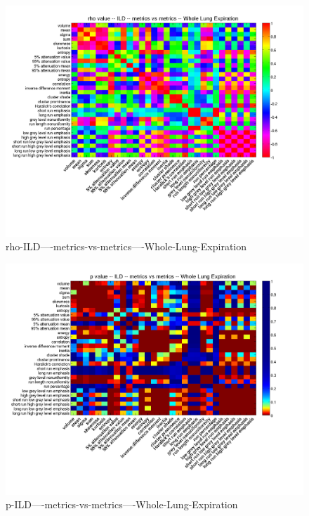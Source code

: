 \documentclass[12pt]{article}
\begin{document}
\begin{figure}
    \includegraphics[width=0.84\linewidth,viewport=100 60 620 550]{corr/rho-ILD----metrics-vs-metrics----Whole-Lung-Expiration.png}
    \caption{rho-ILD----metrics-vs-metrics----Whole-Lung-Expiration}
    \label{fig:rho-ILD----metrics-vs-metrics----Whole-Lung-Expiration}
\end{figure}
\begin{figure}
    \includegraphics[width=0.84\linewidth,viewport=100 60 620 550]{corr/p-ILD----metrics-vs-metrics----Whole-Lung-Expiration.png}
    \caption{p-ILD----metrics-vs-metrics----Whole-Lung-Expiration}
    \label{fig:p-ILD----metrics-vs-metrics----Whole-Lung-Expiration}
\end{figure}
\end{document}
